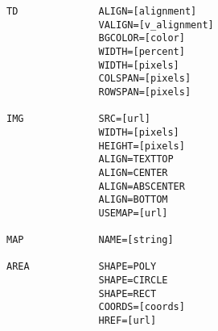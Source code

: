 \begin{verbatim}
TD              ALIGN=[alignment]
                VALIGN=[v_alignment]
                BGCOLOR=[color]
                WIDTH=[percent]
                WIDTH=[pixels]
                COLSPAN=[pixels]
                ROWSPAN=[pixels]

IMG             SRC=[url]
                WIDTH=[pixels]
                HEIGHT=[pixels]
                ALIGN=TEXTTOP
                ALIGN=CENTER
                ALIGN=ABSCENTER
                ALIGN=BOTTOM
                USEMAP=[url]
                
MAP             NAME=[string]

AREA            SHAPE=POLY
                SHAPE=CIRCLE
                SHAPE=RECT
                COORDS=[coords]
                HREF=[url]
                
\end{verbatim}


